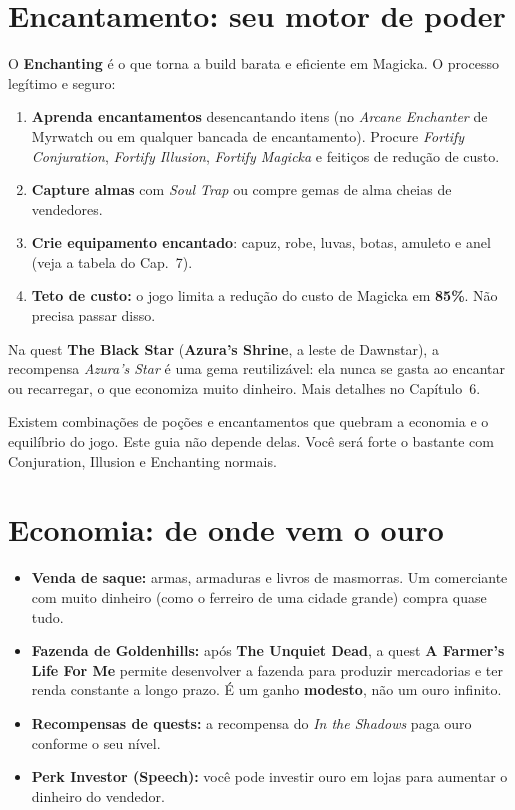 \documentclass[11pt,a4paper,oneside,openany]{book}
\newcommand{\magia}[1]{\textit{\textcolor{SoulCairnPurple}{#1}}}
\newcommand{\quest}[1]{\textsf{\textbf{\textcolor{NecroEmerald}{#1}}}}
\newcommand{\lugar}[1]{\textbf{\textcolor{ImperialGold!75!black}{#1}}}
\newcommand{\objeto}[1]{\textit{\textcolor{NecroEmerald}{#1}}}
\newcommand{\perk}[1]{\textsf{\textcolor{SoulCairnPurple}{#1}}}
\begin{document}
\Needspace{7cm}
\section{Encantamento: seu motor de poder}
O \textbf{Enchanting} é o que torna a build barata e eficiente em Magicka. O processo legítimo e seguro:
\begin{enumerate}
  \item \textbf{Aprenda encantamentos} desencantando itens (no \emph{Arcane Enchanter} de Myrwatch ou em qualquer bancada de encantamento). Procure \textit{Fortify Conjuration}, \textit{Fortify Illusion}, \textit{Fortify Magicka} e feitiços de redução de custo.
  \item \textbf{Capture almas} com \magia{Soul Trap} ou compre gemas de alma cheias de vendedores.
  \item \textbf{Crie equipamento encantado}: capuz, robe, luvas, botas, amuleto e anel (veja a tabela do Cap.~7).
  \item \textbf{Teto de custo:} o jogo limita a redução do custo de Magicka em \textbf{85\%}. Não precisa passar disso.
\end{enumerate}

\begin{exploit}
Na quest \quest{The Black Star} (\lugar{Azura's Shrine}, a leste de Dawnstar), a recompensa \objeto{Azura's Star} é uma gema reutilizável: ela nunca se gasta ao encantar ou recarregar, o que economiza muito dinheiro. Mais detalhes no Capítulo~6.
\end{exploit}

\begin{alerta}
Existem combinações de poções e encantamentos que quebram a economia e o equilíbrio do jogo. Este guia não depende delas. Você será forte o bastante com Conjuration, Illusion e Enchanting normais.
\end{alerta}

\section{Economia: de onde vem o ouro}
\begin{itemize}
  \item \textbf{Venda de saque:} armas, armaduras e livros de masmorras. Um comerciante com muito dinheiro (como o ferreiro de uma cidade grande) compra quase tudo.
  \item \textbf{Fazenda de Goldenhills:} após \quest{The Unquiet Dead}, a quest \quest{A Farmer's Life For Me} permite desenvolver a fazenda para produzir mercadorias e ter renda constante a longo prazo. É um ganho \textbf{modesto}, não um ouro infinito.
  \item \textbf{Recompensas de quests:} a recompensa do \emph{In the Shadows} paga ouro conforme o seu nível.
  \item \textbf{Perk \perk{Investor} (Speech):} você pode investir ouro em lojas para aumentar o dinheiro do vendedor.
\end{itemize}
\end{document}
